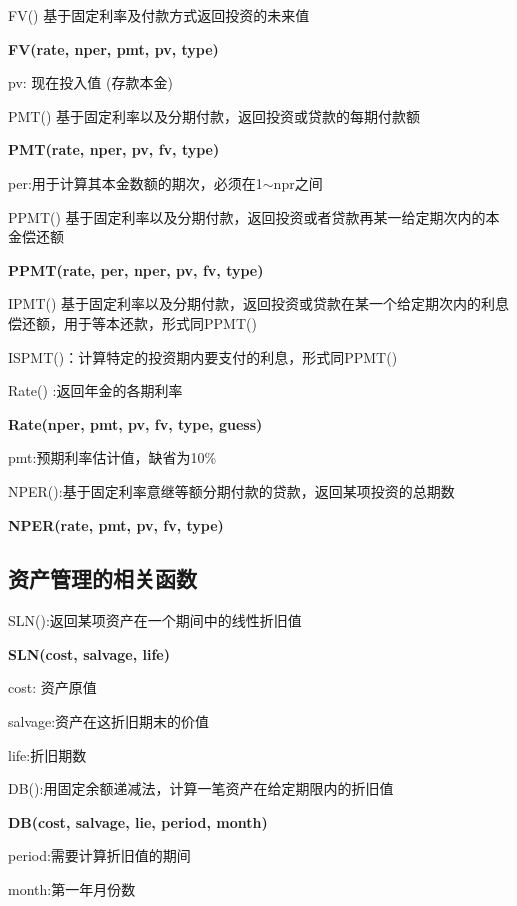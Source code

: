\documentclass[10pt, a4paper]{article}
\begin{document}
FV() 基于固定利率及付款方式返回投资的未来值
\begin{center}
    \textbf{FV(rate, nper, pmt, pv, type)}

    pv: 现在投入值 (存款本金)
\end{center}


PMT() 基于固定利率以及分期付款，返回投资或贷款的每期付款额
\begin{center}
    \textbf{PMT(rate, nper, pv, fv, type)}
    
    per:用于计算其本金数额的期次，必须在1$\sim$npr之间
\end{center}

PPMT() 基于固定利率以及分期付款，返回投资或者贷款再某一给定期次内的本金偿还额

\begin{center}
    \textbf{PPMT(rate, per, nper, pv, fv, type)}
\end{center}

IPMT() 基于固定利率以及分期付款，返回投资或贷款在某一个给定期次内的利息偿还额，用于等本还款，形式同PPMT()

ISPMT()：计算特定的投资期内要支付的利息，形式同PPMT() 

Rate() :返回年金的各期利率
\begin{center}
    \textbf{Rate(nper, pmt, pv, fv, type, guess)}

    pmt:预期利率估计值，缺省为10\%
\end{center}

NPER():基于固定利率意继等额分期付款的贷款，返回某项投资的总期数
\begin{center}
    \textbf{NPER(rate, pmt, pv, fv, type)}
\end{center}

\subsection{资产管理的相关函数}

SLN():返回某项资产在一个期间中的线性折旧值
\begin{center}
    \textbf{SLN(cost,  salvage, life)}

    cost: 资产原值

    salvage:资产在这折旧期末的价值

    life:折旧期数
\end{center}

DB():用固定余额递减法，计算一笔资产在给定期限内的折旧值
\begin{center}
    \textbf{DB(cost, salvage, lie, period, month)}

    period:需要计算折旧值的期间

    month:第一年月份数
\end{center}
\end{document}
